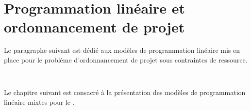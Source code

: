 \chapter{Programmation linéaire et ordonnancement
  de projet}



Le paragraphe suivant est dédié aux modèles de programmation linéaire
mis en place pour le problème d'ordonnancement de projet sous
contraintes de ressource. 


~


Le chapitre suivant est consacré à la présentation des modèles de
programmation linéaire mixtes pour le \CECSP.